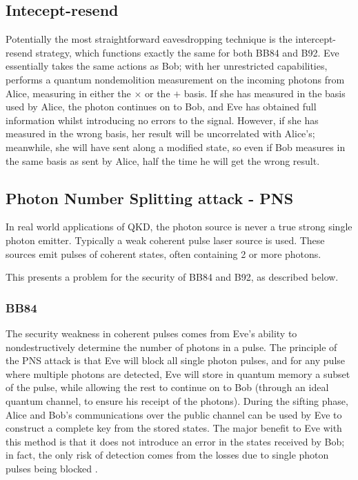 \documentclass[paper=a4, fontsize=11pt]{scrartcl} %
\numberwithin{equation}{section} %
\numberwithin{figure}{section} %
\numberwithin{table}{section} %
\begin{document}
\subsection{Intecept-resend}
Potentially the most straightforward eavesdropping technique is the intercept-resend
strategy, which functions exactly the same for both BB84 and  B92.
Eve essentially takes the same actions as Bob; with her unrestricted capabilities, performs
a quantum nondemolition measurement on the incoming photons from Alice, measuring in either the $\times$
or the $+$ basis. If she has measured in the basis used by Alice, the photon continues on to Bob,
and Eve has obtained full information whilst introducing no errors to the signal. However, if she has measured
in the wrong basis, her result will be uncorrelated with Alice's; meanwhile, she will have sent along
a modified state, so even if Bob measures in the same basis as sent by Alice, half the time he will get the
wrong result. \citep{reviewScariani}


\subsection{Photon Number Splitting attack - PNS}
In real world applications of QKD, the photon source is never a true strong single photon emitter. Typically
a weak coherent pulse laser source is used. \citep{satellites}
These sources emit pulses of coherent states, often containing 2 or more photons.

This presents a problem for the security of BB84 and B92, as described below.

\subsubsection{BB84}
The security weakness in coherent pulses comes from Eve's ability to nondestructively determine the number of photons
in a pulse. The principle of the PNS attack is that Eve will block all single photon pulses, and for any pulse where
multiple photons are detected, Eve will store in quantum memory a subset of the pulse, while allowing the rest to continue
on to Bob (through an ideal quantum channel, to ensure his receipt of the photons). During the sifting
phase, Alice and Bob's communications over the public channel can be used by Eve to construct
a complete key from the stored states. The major benefit to Eve with this method is that it does not introduce an error in the
states received by Bob; in fact, the only risk of detection comes from the losses due to single photon pulses being blocked \citep{kronberg2009}.
\end{document}
